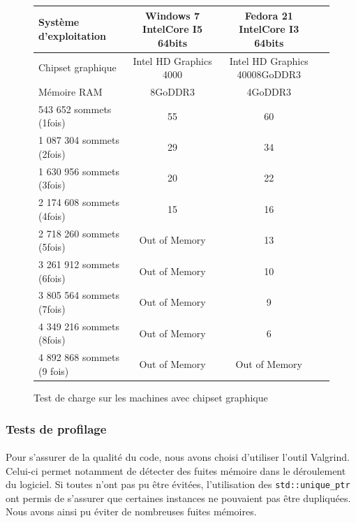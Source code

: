 \begin{figure}[h]
  \begin{changemargin}{-4cm}{-4cm}
    \centering
    \begin{tabular}{|l|c|c|c|}
      \hline
      Système d'exploitation & Windows 7 IntelCore I5 64bits & Fedora 21 IntelCore I3 64bits\\ \hline
      Chipset graphique &  Intel HD Graphics 4000 & Intel HD Graphics 40008GoDDR3 \\ \hline
      Mémoire RAM & 8GoDDR3 & 4GoDDR3 \\ \hline \hline
      543 652 sommets (1fois) & 55 & 60 \\ \hline
      1 087 304 sommets (2fois) & 29 & 34 \\ \hline
      1 630 956 sommets (3fois) & 20 & 22 \\ \hline
      2 174 608 sommets (4fois) & 15 & 16 \\ \hline
      2 718 260 sommets (5fois) & Out of Memory & 13 \\ \hline
      3 261 912 sommets (6fois) & Out of Memory & 10 \\ \hline
      3 805 564 sommets (7fois) & Out of Memory & 9 \\ \hline
      4 349 216 sommets (8fois) & Out of Memory & 6 \\ \hline
      4 892 868 sommets (9 fois) & Out of Memory & Out of Memory \\ \hline
    \end{tabular}
  \end{changemargin}
  \caption{Test de charge sur les machines avec chipset graphique}
  \label{tab:fps_chip}
\end{figure}

\subsubsection{Tests de profilage}
\paragraph{}
Pour s'assurer de la qualité du code, nous avons choisi d'utiliser l'outil Valgrind. Celui-ci permet notamment de détecter des fuites mémoire dans le déroulement du logiciel. Si toutes n'ont pas pu être évitées, l'utilisation des \texttt{std::unique\_ptr} ont permis de s'assurer que certaines instances ne pouvaient pas être dupliquées. Nous avons ainsi pu éviter de nombreuses fuites mémoires.


